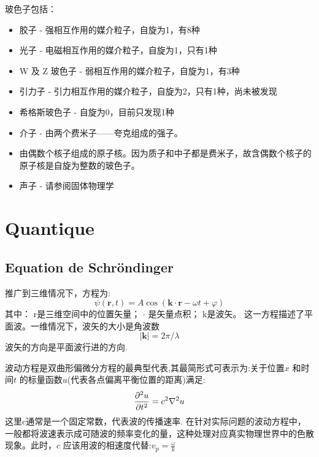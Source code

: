 \documentclass[openany]{book}
\begin{document}
玻色子包括：
\begin{itemize}
\item 胶子 - 强相互作用的媒介粒子，自旋为1，有8种
\item 光子 - 电磁相互作用的媒介粒子，自旋为1，只有1种
\item W 及 Z 玻色子 - 弱相互作用的媒介粒子，自旋为1，有3种
\item 引力子 - 引力相互作用的媒介粒子，自旋为2，只有1种，尚未被发现
\item 希格斯玻色子 - 自旋为0，目前只发现1种
\item 介子 - 由两个费米子——夸克组成的强子。
\item 由偶数个核子组成的原子核。因为质子和中子都是费米子，故含偶数个核子的原子核是自旋为整数的玻色子。
\item 声子 - 请参阅固体物理学
\end{itemize}

\chapter{Quantique}
\section{Equation de Schr\"ondinger}
推广到三维情况下，方程为:
$$
\psi \left({\mathbf r}, t \right) = A \cos \left({\mathbf k} \cdot {\mathbf r} - \omega t + \varphi \right)
$$
其中：
r是三维空间中的位置矢量；
$\cdot$ 是矢量点积；
k是波矢。
这一方程描述了平面波。一维情况下，波矢的大小是角波数
$$|{\mathbf k}| = 2\pi/\lambda$$
波矢的方向是平面波行进的方向.

波动方程是双曲形偏微分方程的最典型代表,其最简形式可表示为:关于位置$x$ 和时间$t$ 的标量函数$u$(代表各点偏离平衡位置的距离)满足:
$$
{ \partial^2 u \over \partial t^2 } = c^2 \nabla^2u
$$
这里c通常是一个固定常数，代表波的传播速率.
在针对实际问题的波动方程中，一般都将波速表示成可随波的频率变化的量，这种处理对应真实物理世界中的色散现象。此时，$ c$  应该用波的相速度代替:$v_\mathrm{p} = \frac{\omega}{k}$
\end{document}
